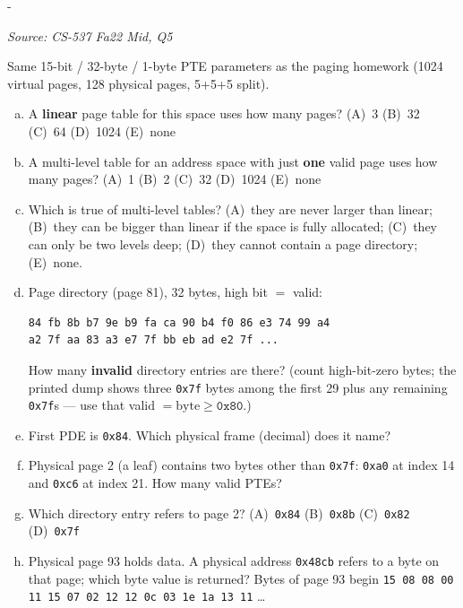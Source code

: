 \documentclass[11pt,a4paper]{article}
\makeatletter
\newcommand{\keepspace}[1]{\par\penalty-100\begingroup
  \setlength{\dimen@}{#1}\dimen@ii\pagegoal\advance\dimen@ii-\pagetotal
  \ifdim\dimen@>\dimen@ii\ifdim\dimen@ii>\z@\vfil\fi\break\fi\endgroup}
\newcounter{qn}[section]
\newenvironment{Qn}[4]{%
  \refstepcounter{qn}\keepspace{7\baselineskip}%
  \begin{tcolorbox}[qboxstyle, title={Q\thesection.\theqn\ \ [#1 \textbar\ #2]\ \ #4}]%
  {\footnotesize\color{g3}\textit{Source: #3}}\par\smallskip%
}{%
  \end{tcolorbox}%
}
\makeatother
\begin{document}
\begin{Qn}{Medium-Hard}{Lect 14}{CS-537 Fa22 Mid, Q5}{Tiny two-level table: linear size, sparsity, PDE decode}
Same 15-bit / 32-byte / 1-byte PTE parameters as the paging homework
(1024 virtual pages, 128 physical pages, 5+5+5 split).
\begin{enumerate}[(a)]
\item A \textbf{linear} page table for this space uses how many pages?
      (A)~3 (B)~32 (C)~64 (D)~1024 (E)~none
\item A multi-level table for an address space with just \textbf{one}
      valid page uses how many pages? (A)~1 (B)~2 (C)~32 (D)~1024 (E)~none
\item Which is true of multi-level tables?
      (A)~they are never larger than linear;
      (B)~they can be bigger than linear if the space is fully allocated;
      (C)~they can only be two levels deep;
      (D)~they cannot contain a page directory;
      (E)~none.
\item Page directory (page 81), 32 bytes, high bit $=$ valid:
\begin{lstlisting}[numbers=none]
84 fb 8b b7 9e b9 fa ca 90 b4 f0 86 e3 74 99 a4
a2 7f aa 83 a3 e7 7f bb eb ad e2 7f ...
\end{lstlisting}
      How many \textbf{invalid} directory entries are there?
      (count high-bit-zero bytes; the printed dump shows three
      \texttt{0x7f} bytes among the first 29 plus any remaining
      \texttt{0x7f}s --- use that valid $= \mathrm{byte}\ge\texttt{0x80}$.)
\item First PDE is \texttt{0x84}. Which physical frame (decimal) does it
      name?
\item Physical page 2 (a leaf) contains two bytes other than
      \texttt{0x7f}: \texttt{0xa0} at index 14 and \texttt{0xc6} at
      index 21. How many valid PTEs?
\item Which directory entry refers to page 2?
      (A)~\texttt{0x84} (B)~\texttt{0x8b} (C)~\texttt{0x82} (D)~\texttt{0x7f}
\item Physical page 93 holds data. A physical address \texttt{0x48cb}
      refers to a byte on that page; which byte value is returned?
      Bytes of page 93 begin
      \texttt{15 08 08 00 11 15 07 02 12 12 0c 03 1e 1a 13 11} \ldots
\end{enumerate}
\end{Qn}
\end{document}
